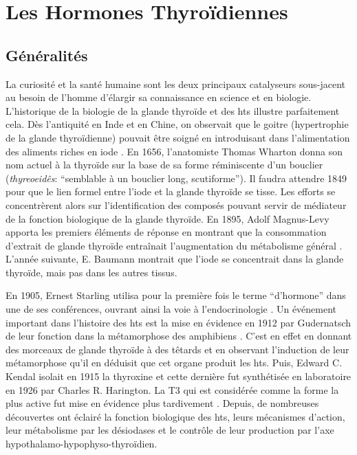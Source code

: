\documentclass[../main.tex]{subfiles}
\begin{document}
\chapter{Les Hormones Thyroïdiennes}


\section{Généralités}

	La curiosité et la santé humaine sont les deux principaux catalyseurs sous-jacent au besoin de l'homme d'élargir sa connaissance en science et en biologie.
	L'historique de la biologie de la glande thyroïde et des \glspl{ht} illustre parfaitement cela.
	Dès l'antiquité en Inde et en Chine, on observait que le goitre (hypertrophie de la glande thyroïdienne) pouvait être soigné en introduisant dans l'alimentation des aliments riches en iode \citep{Niazi2011}.
	En 1656, l'anatomiste Thomas Wharton donna son nom actuel à la thyroïde sur la base de sa forme réminiscente d'un bouclier (\textit{thyreoeidês}: ``semblable à un bouclier long, scutiforme'').
	Il faudra attendre 1849 pour que le lien formel entre l'iode et la glande thyroïde se tisse.
	Les efforts se concentrèrent alors sur l'identification des composés pouvant servir de médiateur de la fonction biologique de la glande thyroïde.
	En 1895, Adolf Magnus-Levy apporta les premiers éléments de réponse en montrant que la consommation d'extrait de glande thyroïde entraînait l'augmentation du métabolisme général \citep{Magnus-Levy1895}.
	L'année suivante, E. Baumann montrait que l'iode se concentrait dans la glande thyroïde, mais pas dans les autres tissus\citep{Baumann1896}.
	\par
	En 1905, Ernest Starling utilisa pour la première fois le terme ``d'hormone'' dans une de ses conférences, ouvrant ainsi la voie à l'endocrinologie .
	Un événement important dans l'histoire des \glspl{ht} est la mise en évidence en 1912 par Gudernatsch de leur fonction dans la métamorphose des amphibiens \citep{Gudernatsch1912}.
	C'est en effet en donnant des morceaux de glande thyroïde à des têtards et en observant l'induction de leur métamorphose qu'il en déduisit que cet organe produit les \glspl{ht}.
	Puis, Edward C. Kendal isolait en 1915 la thyroxine et cette dernière fut synthétisée en laboratoire en 1926 par Charles R. Harington.
	La T3 qui est considérée comme la forme la plus active fut mise en évidence plus tardivement \citep{Gross1952,Roche1952}.
	Depuis, de nombreuses découvertes ont éclairé la fonction biologique des \glspl{ht}, leurs mécanismes d'action, leur métabolisme par les désiodases et le contrôle de leur production par l'axe hypothalamo-hypophyso-thyroïdien.
\end{document}
